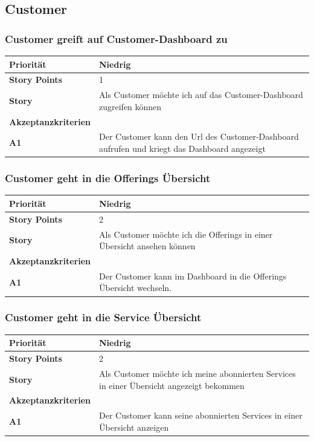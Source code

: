 \documentclass[11pt]{scrartcl}
\begin{document}
\subsection{Customer}
\subsubsection{Customer greift auf Customer-Dashboard zu}
\begin{tabularx}{\linewidth}{l X}
  \textbf{Priorität} & Niedrig\\
  \hline
  \textbf{Story Points} & 1\\
  \hline
  \textbf{Story}& Als Customer möchte ich auf das Customer-Dashboard zugreifen können\\
  \hline
    \textbf{Akzeptanzkriterien} & \\
    \hline
  \textbf{A1} & Der Customer kann den Url des Customer-Dashboard aufrufen und 
  kriegt das Dashboard angezeigt\\
  \hline
   \end{tabularx}
   
 \subsubsection{Customer geht in die Offerings Übersicht}
\begin{tabularx}{\linewidth}{l X}
  \textbf{Priorität} & Niedrig\\
  \hline
  \textbf{Story Points} & 2\\
  \hline
  \textbf{Story}& Als Customer möchte ich die Offerings in einer Übersicht ansehen können\\
  \hline
    \textbf{Akzeptanzkriterien} & \\
    \hline
  \textbf{A1} & Der Customer kann im Dashboard in die Offerings Übersicht wechseln.\\
  \hline
   \end{tabularx}
   
 \subsubsection{Customer geht in die Service Übersicht}
\begin{tabularx}{\linewidth}{l X}
  \textbf{Priorität} & Niedrig\\
  \hline
  \textbf{Story Points} & 2\\
  \hline
  \textbf{Story}& Als Customer möchte ich meine abonnierten Services in einer Übersicht angezeigt bekommen\\
  \hline
    \textbf{Akzeptanzkriterien} & \\
    \hline
  \textbf{A1} & Der Customer kann seine abonnierten Services in einer Übersicht anzeigen\\
  \hline
   \end{tabularx}
   
\end{document}
